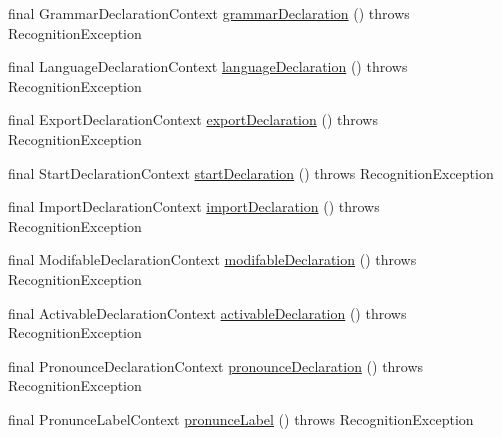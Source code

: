 \begin{DoxyCompactItemize}
\item 
final Grammar\-Declaration\-Context \hyperlink{classit_1_1emarolab_1_1cagg_1_1core_1_1language_1_1parser_1_1ANTLRInterface_1_1ANTLRGenerated_1_1CAGGSyntaxDefinitionParser_a65fadfdec208be1ed0aebd9d5fb5ed27}{grammar\-Declaration} ()  throws Recognition\-Exception 
\item 
final Language\-Declaration\-Context \hyperlink{classit_1_1emarolab_1_1cagg_1_1core_1_1language_1_1parser_1_1ANTLRInterface_1_1ANTLRGenerated_1_1CAGGSyntaxDefinitionParser_a79e9ba5cdcdf0aa883f3433b049ae1ff}{language\-Declaration} ()  throws Recognition\-Exception 
\item 
final Export\-Declaration\-Context \hyperlink{classit_1_1emarolab_1_1cagg_1_1core_1_1language_1_1parser_1_1ANTLRInterface_1_1ANTLRGenerated_1_1CAGGSyntaxDefinitionParser_afdda60ea79bbe869d154dcc6835620c6}{export\-Declaration} ()  throws Recognition\-Exception 
\item 
final Start\-Declaration\-Context \hyperlink{classit_1_1emarolab_1_1cagg_1_1core_1_1language_1_1parser_1_1ANTLRInterface_1_1ANTLRGenerated_1_1CAGGSyntaxDefinitionParser_abdc92283b8df85bbc2132a4a6cba4e5e}{start\-Declaration} ()  throws Recognition\-Exception 
\item 
final Import\-Declaration\-Context \hyperlink{classit_1_1emarolab_1_1cagg_1_1core_1_1language_1_1parser_1_1ANTLRInterface_1_1ANTLRGenerated_1_1CAGGSyntaxDefinitionParser_adb1aa6fd4bc13763724c6463abd6cc01}{import\-Declaration} ()  throws Recognition\-Exception 
\item 
final Modifable\-Declaration\-Context \hyperlink{classit_1_1emarolab_1_1cagg_1_1core_1_1language_1_1parser_1_1ANTLRInterface_1_1ANTLRGenerated_1_1CAGGSyntaxDefinitionParser_aacf64285c0d1439a4ccabab0f9269fa3}{modifable\-Declaration} ()  throws Recognition\-Exception 
\item 
final Activable\-Declaration\-Context \hyperlink{classit_1_1emarolab_1_1cagg_1_1core_1_1language_1_1parser_1_1ANTLRInterface_1_1ANTLRGenerated_1_1CAGGSyntaxDefinitionParser_ad777874dd0a145201d83e1793f6477ce}{activable\-Declaration} ()  throws Recognition\-Exception 
\item 
final Pronounce\-Declaration\-Context \hyperlink{classit_1_1emarolab_1_1cagg_1_1core_1_1language_1_1parser_1_1ANTLRInterface_1_1ANTLRGenerated_1_1CAGGSyntaxDefinitionParser_a26694c4e2e3a9e85a40359e2cfda55ef}{pronounce\-Declaration} ()  throws Recognition\-Exception 
\item 
final Pronunce\-Label\-Context \hyperlink{classit_1_1emarolab_1_1cagg_1_1core_1_1language_1_1parser_1_1ANTLRInterface_1_1ANTLRGenerated_1_1CAGGSyntaxDefinitionParser_a8f4e813501de4e76e1750bb641f0d54f}{pronunce\-Label} ()  throws Recognition\-Exception 

\end{DoxyCompactItemize}
